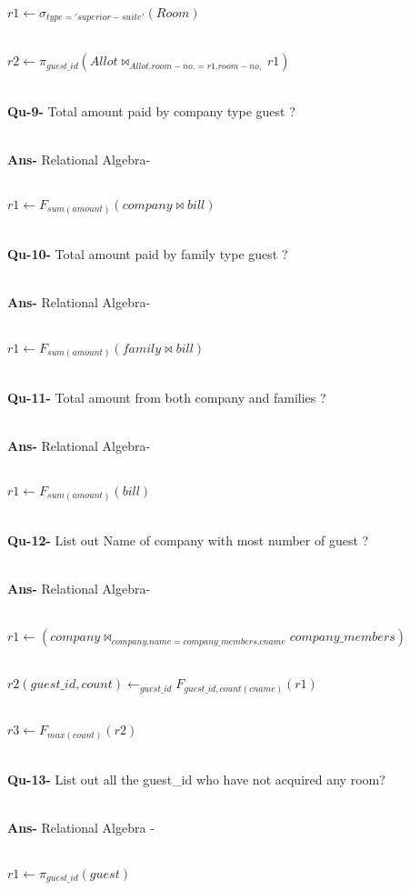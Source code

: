 \documentclass[a4,12pt]{report}
\begin{document}
\begin{flushleft}
			$ r1 \leftarrow \sigma_{type = 'superior-suite'}(Room) $ \\\
			
			$ r2 \leftarrow \pi_{guest\_id}(Allot  \bowtie_{Allot.room-no. = r1.room-no,} r1 ) $ \\\
			
\textbf{Qu-9-} Total amount paid by company type guest ? \\\

\textbf{Ans-} Relational Algebra- \\\

			$ r1 \leftarrow F_{sum(amount)}(company \bowtie bill) $ \\\
			
\textbf{Qu-10-} Total amount paid by family type guest ? \\\

\textbf{Ans-} Relational Algebra- \\\

			$ r1 \leftarrow F_{sum(amount)}(family \bowtie bill) $ \\\
			
\textbf{Qu-11-} Total amount from both company and families ? \\\

\textbf{Ans-} Relational Algebra- \\\

			$ r1 \leftarrow F_{sum(amount)}(bill) $ \\\

\textbf{Qu-12-} List out Name of company with most number of guest ? \\\

\textbf{Ans-} Relational Algebra- \\\

			$ r1 \leftarrow (company \bowtie_{company.name = company\_members.cname} company\_members) $ \\\
			
			$ r2(guest\_id,count) \leftarrow   _{guest\_id} F_{guest\_id,count(cname)}(r1) $ \\\
			
			$ r3 \leftarrow  F_{max(count)}(r2) $ \\\
			
			
\textbf{Qu-13-} List out all the guest\_id who have not acquired any room? \\\

\textbf{Ans-} Relational Algebra - \\\

			$ r1 \leftarrow \pi_{guest\_id}(guest) $ \\\
			

\end{flushleft}
\end{document}
